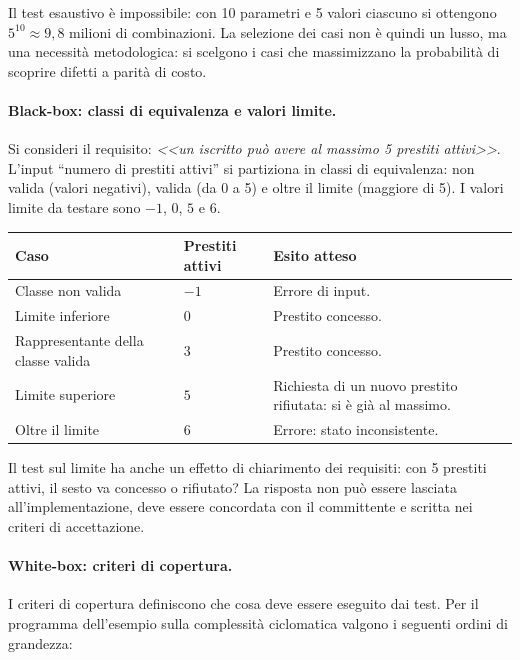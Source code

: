 \documentclass[12pt]{extarticle}
\begin{document}
\noindent Il test esaustivo è impossibile: con 10 parametri e 5 valori ciascuno si ottengono $5^{10} \approx 9{,}8$ milioni di combinazioni. La selezione dei casi non è quindi un lusso, ma una necessità metodologica: si scelgono i casi che massimizzano la probabilità di scoprire difetti a parità di costo.

\paragraph{Black-box: classi di equivalenza e valori limite.}
Si consideri il requisito: \textit{<<un iscritto può avere al massimo 5 prestiti attivi>>}. L'input ``numero di prestiti attivi'' si partiziona in classi di equivalenza: non valida (valori negativi), valida (da 0 a 5) e oltre il limite (maggiore di 5). I valori limite da testare sono $-1$, $0$, $5$ e $6$.

\begin{center}
\small
\begin{tabular}{p{3.8cm}p{3.2cm}p{8.6cm}}
    \toprule
    \textbf{Caso} & \textbf{Prestiti attivi} & \textbf{Esito atteso} \\
    \midrule
    Classe non valida & $-1$ & Errore di input. \\
    Limite inferiore & $0$ & Prestito concesso. \\
    Rappresentante della classe valida & $3$ & Prestito concesso. \\
    Limite superiore & $5$ & Richiesta di un nuovo prestito rifiutata: si è già al massimo. \\
    Oltre il limite & $6$ & Errore: stato inconsistente. \\
    \bottomrule
\end{tabular}
\end{center}

\noindent Il test sul limite ha anche un effetto di chiarimento dei requisiti: con 5 prestiti attivi, il sesto va concesso o rifiutato? La risposta non può essere lasciata all'implementazione, deve essere concordata con il committente e scritta nei criteri di accettazione.

\paragraph{White-box: criteri di copertura.}
I criteri di copertura definiscono che cosa deve essere eseguito dai test. Per il programma dell'esempio sulla complessità ciclomatica valgono i seguenti ordini di grandezza:
\end{document}
